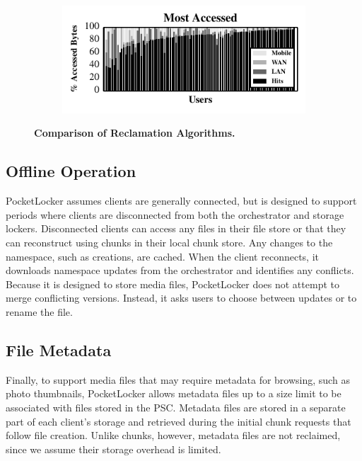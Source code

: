 \begin{figure}[t]
\begin{subfigure}[t]{0.5\columnwidth}
  \end{subfigure}%
  \begin{subfigure}[t]{0.5\columnwidth}

    \includegraphics[width=\columnwidth]{./figures/pocketlocker/AccessSimulatorPerformanceGraph.pdf}

  \end{subfigure}

  \caption{\small \textbf{Comparison of Reclamation Algorithms.}}

  \label{fig-simulation-policy}
  
  \vspace*{-0.2in}
\end{figure}

\subsection{Offline Operation}

PocketLocker assumes clients are generally connected, but is designed to
support periods where clients are disconnected from both the orchestrator and
storage lockers.  Disconnected clients can access any files in their file store
or that they can reconstruct using chunks in their local chunk store. Any
changes to the namespace, such as creations, are cached.  When the client
reconnects, it downloads namespace updates from the orchestrator and identifies
any conflicts. Because it is designed to store media files, PocketLocker does
not attempt to merge conflicting versions. Instead, it asks users to choose
between updates or to rename the file.

\subsection{File Metadata}

Finally, to support media files that may require metadata for browsing, such
as photo thumbnails, PocketLocker allows metadata files up to a size limit to
be associated with files stored in the PSC. Metadata files are stored in a
separate part of each client's storage and retrieved during the initial chunk
requests that follow file creation. Unlike chunks, however, metadata files
are not reclaimed, since we assume their storage overhead is limited.

